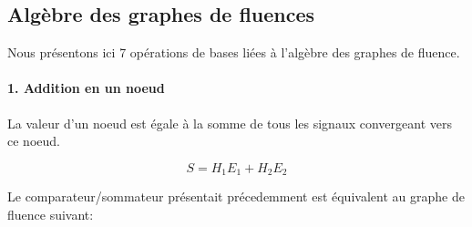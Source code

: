 \subsection{Algèbre des graphes de fluences}
Nous présentons ici 7 opérations de bases liées à l'algèbre des graphes de fluence.

\paragraph{1. Addition en un noeud}

La valeur d'un noeud est égale à la somme de tous les signaux convergeant vers ce noeud.
\begin{center}
\end{center}
$$
S=H_1E_1+H_2E_2
$$

Le comparateur/sommateur présentait précedemment est équivalent au graphe 
de fluence suivant:

\begin{center}
\end{center}

